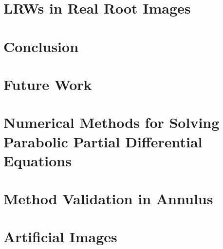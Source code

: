 \documentclass{uofsthesis-cs}
\begin{document}
  

  



  
  
\chapter{LRWs in Real Root Images}

 

\chapter{Conclusion}
  


  
\chapter{Future Work}

 







  \uofsappendix %

  \begin{appendices}
    
    \chapter{Numerical Methods for Solving Parabolic Partial Differential Equations}
      

    \chapter{Method Validation in Annulus}
      

    \chapter{Artificial Images}
      

    
  \end{appendices}
  
  



\end{document}
